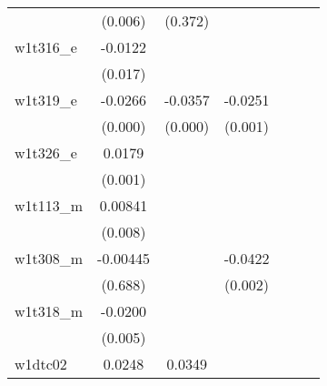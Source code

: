 {\begin{tabular}{l*{6}{c}}
            &     (0.006)         &     (0.372)         &                     &                     &                     &                     \\
[1em]
w1t316\_e    &     -0.0122\sym{**} &                     &                     &                     &                     &                     \\
            &     (0.017)         &                     &                     &                     &                     &                     \\
[1em]
w1t319\_e    &     -0.0266\sym{***}&     -0.0357\sym{***}&     -0.0251\sym{***}&                     &                     &                     \\
            &     (0.000)         &     (0.000)         &     (0.001)         &                     &                     &                     \\
[1em]
w1t326\_e    &      0.0179\sym{***}&                     &                     &                     &                     &                     \\
            &     (0.001)         &                     &                     &                     &                     &                     \\
[1em]
w1t113\_m    &     0.00841\sym{***}&                     &                     &                     &                     &                     \\
            &     (0.008)         &                     &                     &                     &                     &                     \\
[1em]
w1t308\_m    &    -0.00445         &                     &     -0.0422\sym{***}&                     &                     &                     \\
            &     (0.688)         &                     &     (0.002)         &                     &                     &                     \\
[1em]
w1t318\_m    &     -0.0200\sym{***}&                     &                     &                     &                     &                     \\
            &     (0.005)         &                     &                     &                     &                     &                     \\
[1em]
w1dtc02     &      0.0248\sym{***}&      0.0349\sym{***}&                     &                     &                     &                     \\

\end{tabular}}
